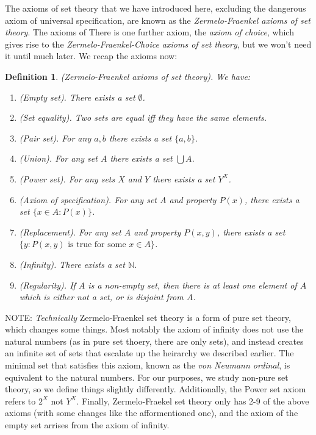 \documentclass{article}
\newtheorem{definition}{Definition}[subsection]
\newcommand{\N}{\mathbb{N}}
\let\it\textit
\begin{document}
The axioms of set theory that we have introduced here, excluding the 
dangerous axiom of universal specification, are known as the
\it{Zermelo-Fraenkel axioms of set theory}. The axioms of
There is one further axiom, the \it{axiom of choice}, which 
gives rise to the \it{Zermelo-Fraenkel-Choice axioms of set theory},
but we won't need it until much later. We recap the axioms now: 

\begin{definition}
	(Zermelo-Fraenkel axioms of set theory). We have:	
	\begin{enumerate}
		\item (Empty set). There exists a set $\emptyset$.
		\item (Set equality). Two sets are equal iff they have the same elements.
		\item (Pair set). For any $a,b$ there exists a set $\{a,b\}$.
		\item (Union). For any set $A$ there exists a set $\bigcup A$.
		\item (Power set). For any sets $X$ and $Y$ there exists a set $Y^X$.
		\item (Axiom of specification). For any set $A$ and property $P(x)$, 
			there exists a set $\{x \in A : P(x)\}$.
		\item (Replacement). For any set $A$ and property $P(x,y)$, 
			there exists a set $\{y : P(x,y) \text{ is true for some } x \in A\}$.
		\item (Infinity). There exists a set $\N$.
		\item (Regularity). If $A$ is a non-empty set, then there is 
			at least one element of $A$ which is either not a set, 
			or is disjoint from $A$.	
	\end{enumerate}
\end{definition}

NOTE: \it{Technically} Zermelo-Fraenkel set theory is a form of pure set 
theory, which changes some things. Most notably the axiom of infinity 
does not use the natural numbers (as in pure set thoery, there 
are only sets), and instead creates an infinite set of sets that 
escalate up the heirarchy we described earlier. The minimal set
that satisfies this axiom, known as the \it{von Neumann ordinal}, is
equivalent to the natural numbers. For our purposes, we study 
non-pure set theory, so we define things slightly differently. Additionally, 
the Power set axiom refers to $2^X$ not $Y^X$. Finally,
Zermelo-Fraekel set theory only has 2-9 of the above axioms 
(with some changes like the afformentioned one), and the axiom of
the empty set arrises from the axiom of infinity. 
\end{document}
